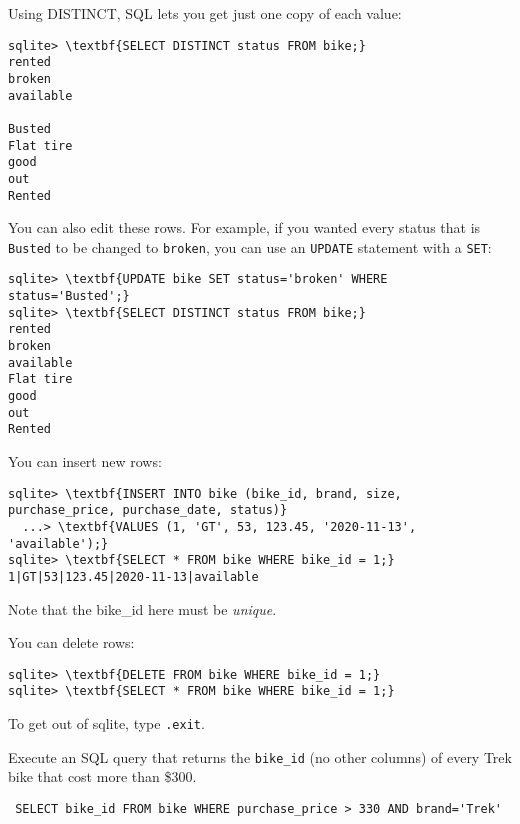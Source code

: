 Using DISTINCT, SQL lets you get just one copy of each value:
\begin{Verbatim}[commandchars=\\\{\}]
sqlite> \textbf{SELECT DISTINCT status FROM bike;}
rented
broken
available

Busted
Flat tire
good
out
Rented
\end{Verbatim}

You can also edit these rows. For example, if you wanted every status
that is \texttt{Busted} to be changed to \texttt{broken}, you can use an \verb|UPDATE| statement with a \verb|SET|:

\begin{Verbatim}[commandchars=\\\{\}]
sqlite> \textbf{UPDATE bike SET status='broken' WHERE status='Busted';}
sqlite> \textbf{SELECT DISTINCT status FROM bike;}
rented
broken
available
Flat tire
good
out
Rented
\end{Verbatim}

You can insert new rows:
\begin{Verbatim}[commandchars=\\\{\}]
sqlite> \textbf{INSERT INTO bike (bike_id, brand, size, purchase_price, purchase_date, status)}
  ...> \textbf{VALUES (1, 'GT', 53, 123.45, '2020-11-13', 'available');}
sqlite> \textbf{SELECT * FROM bike WHERE bike_id = 1;}
1|GT|53|123.45|2020-11-13|available
\end{Verbatim}
Note that the bike\_id here must be \emph{unique}. 

You can delete rows:
\begin{Verbatim}[commandchars=\\\{\}]
sqlite> \textbf{DELETE FROM bike WHERE bike_id = 1;}
sqlite> \textbf{SELECT * FROM bike WHERE bike_id = 1;}
\end{Verbatim}

To get out of sqlite, type \texttt{.exit}.

\begin{Exercise}[title={SQL Query}, label=sql_where]
 Execute an SQL query that returns the \texttt{bike\_id} (no other
 columns) of every Trek bike that cost more than \$300.
\end{Exercise}
\begin{Answer}[ref=sql_where]
\begin{Verbatim}
 SELECT bike_id FROM bike WHERE purchase_price > 330 AND brand='Trek'
\end{Verbatim}
\end{Answer}

